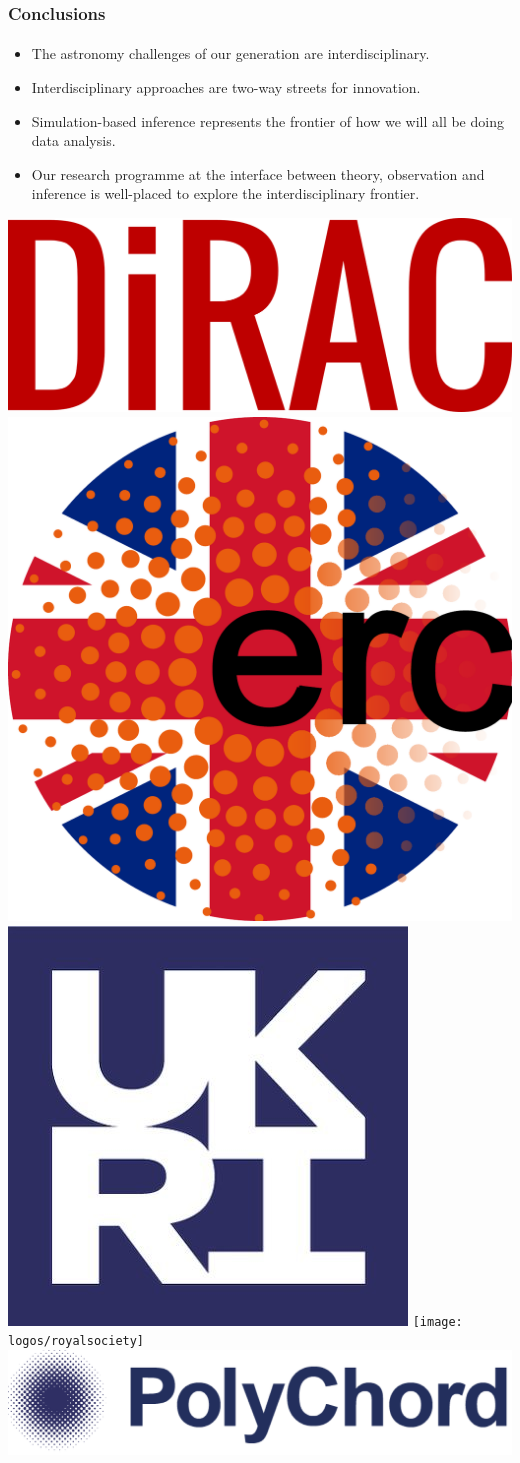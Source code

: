 \documentclass[aspectratio=169]{beamer}
\begin{document}
\begin{frame}
    \frametitle{Conclusions}
    \framesubtitle{}
    \begin{itemize}
        \item The astronomy challenges of our generation are interdisciplinary.
        \item Interdisciplinary approaches are two-way streets for innovation.
        \item Simulation-based inference represents the frontier of how we will all be doing data analysis.
        \item Our research programme at the interface between theory, observation and inference is well-placed to explore the interdisciplinary frontier.
    \end{itemize}
    \vspace{10pt}

    \includegraphics[height=0.09\textwidth]{logos/dirac.png}%
    \includegraphics[height=0.09\textwidth]{logos/ukerc}
    \includegraphics[height=0.09\textwidth]{logos/ukri}
    \texttt{[image: logos/royalsociety]}
    \includegraphics[height=0.09\textwidth]{logos/polychord}


\end{frame}
\end{document}
